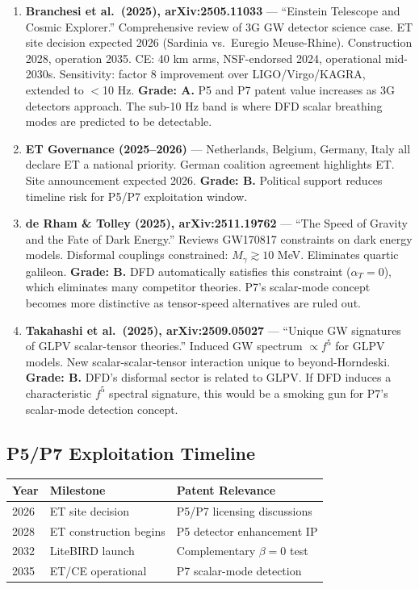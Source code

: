 \documentclass[11pt,a4paper]{article}
\begin{document}
\begin{enumerate}

\item \textbf{Branchesi et al.\ (2025), arXiv:2505.11033} --- ``Einstein Telescope and Cosmic Explorer.'' Comprehensive review of 3G GW detector science case. ET site decision expected 2026 (Sardinia vs.\ Euregio Meuse-Rhine). Construction 2028, operation 2035. CE: 40 km arms, NSF-endorsed 2024, operational mid-2030s. Sensitivity: factor 8 improvement over LIGO/Virgo/KAGRA, extended to $<$10 Hz. \textbf{Grade: A.} P5 and P7 patent value increases as 3G detectors approach. The sub-10 Hz band is where DFD scalar breathing modes are predicted to be detectable.

\item \textbf{ET Governance (2025--2026)} --- Netherlands, Belgium, Germany, Italy all declare ET a national priority. German coalition agreement highlights ET. Site announcement expected 2026. \textbf{Grade: B.} Political support reduces timeline risk for P5/P7 exploitation window.

\item \textbf{de Rham \& Tolley (2025), arXiv:2511.19762} --- ``The Speed of Gravity and the Fate of Dark Energy.'' Reviews GW170817 constraints on dark energy models. Disformal couplings constrained: $M_\gamma \gtrsim 10$ MeV. Eliminates quartic galileon. \textbf{Grade: B.} DFD automatically satisfies this constraint ($\alpha_T = 0$), which eliminates many competitor theories. P7's scalar-mode concept becomes more distinctive as tensor-speed alternatives are ruled out.

\item \textbf{Takahashi et al.\ (2025), arXiv:2509.05027} --- ``Unique GW signatures of GLPV scalar-tensor theories.'' Induced GW spectrum $\propto f^5$ for GLPV models. New scalar-scalar-tensor interaction unique to beyond-Horndeski. \textbf{Grade: B.} DFD's disformal sector is related to GLPV. If DFD induces a characteristic $f^5$ spectral signature, this would be a smoking gun for P7's scalar-mode detection concept.

\end{enumerate}

\subsection{P5/P7 Exploitation Timeline}
\begin{center}
\begin{tabular}{lll}
\toprule
\textbf{Year} & \textbf{Milestone} & \textbf{Patent Relevance} \\
\midrule
2026 & ET site decision & P5/P7 licensing discussions \\
2028 & ET construction begins & P5 detector enhancement IP \\
2032 & LiteBIRD launch & Complementary $\beta=0$ test \\
2035 & ET/CE operational & P7 scalar-mode detection \\
\bottomrule
\end{tabular}
\end{center}
\end{document}
